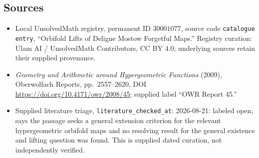 \documentclass[11pt]{article}
\begin{document}
\subsection{Sources}
\begin{itemize}
\item Local UnsolvedMath registry, permanent ID \(30001077\), source code \texttt{catalogue entry}, ``Orbifold Lifts of Deligne Mostow Forgetful Maps.'' Registry curation: Ulam AI / UnsolvedMath Contributors, CC BY 4.0; underlying sources retain their supplied provenance.
\item \emph{Geometry and Arithmetic around Hypergeometric Functions} (2009), Oberwolfach Reports, pp.\ 2557--2620, DOI \url{https://doi.org/10.4171/owr/2008/45}; supplied label ``OWR Report 45.''
\item Supplied literature triage, \texttt{literature\_checked\_at}: 2026-08-21: labeled open; says the passage seeks a general extension criterion for the relevant hypergeometric orbifold maps and no resolving result for the general existence and lifting question was found. This is supplied dated curation, not independently verified.
\end{itemize}
\end{document}

